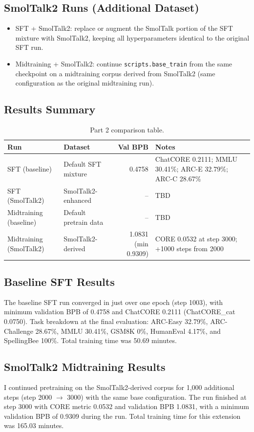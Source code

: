 \documentclass[11pt]{article}
\begin{document}
\subsection*{SmolTalk2 Runs (Additional Dataset)}
\begin{itemize}
\item SFT + SmolTalk2: replace or augment the SmolTalk portion of the SFT mixture with SmolTalk2, keeping all hyperparameters identical to the original SFT run.
\item Midtraining + SmolTalk2: continue \texttt{scripts.base\_train} from the same checkpoint on a midtraining corpus derived from SmolTalk2 (same configuration as the original midtraining run).
\end{itemize}

\subsection*{Results Summary}
\begin{table}[h]
\centering
\begin{tabular}{l l r l}
\toprule
\textbf{Run} & \textbf{Dataset} & \textbf{Val BPB} & \textbf{Notes} \\
\midrule
SFT (baseline) & Default SFT mixture & 0.4758 & ChatCORE 0.2111; MMLU 30.41\%; ARC-E 32.79\%; ARC-C 28.67\% \\
SFT (SmolTalk2) & SmolTalk2-enhanced & -- & TBD \\
Midtraining (baseline) & Default pretrain data & -- & TBD \\
Midtraining (SmolTalk2) & SmolTalk2-derived & 1.0831 (min 0.9309) & CORE 0.0532 at step 3000; +1000 steps from 2000 \\
\bottomrule
\end{tabular}
\caption{Part 2 comparison table.}
\end{table}

\subsection*{Baseline SFT Results}
The baseline SFT run converged in just over one epoch (step 1003), with minimum validation BPB of 0.4758 and ChatCORE 0.2111 (ChatCORE\_cat 0.0750). Task breakdown at the final evaluation: ARC-Easy 32.79\%, ARC-Challenge 28.67\%, MMLU 30.41\%, GSM8K 0\%, HumanEval 4.17\%, and SpellingBee 100\%. Total training time was 50.69 minutes.

\subsection*{SmolTalk2 Midtraining Results}
I continued pretraining on the SmolTalk2-derived corpus for 1,000 additional steps (step 2000 $\rightarrow$ 3000) with the same base configuration. The run finished at step 3000 with CORE metric 0.0532 and validation BPB 1.0831, with a minimum validation BPB of 0.9309 during the run. Total training time for this extension was 165.03 minutes.
\end{document}
